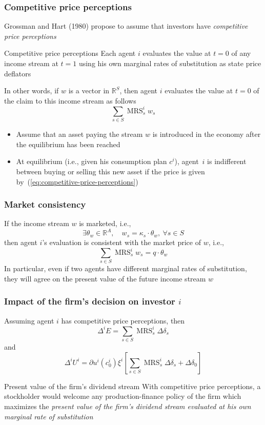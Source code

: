 \documentclass[blue]{beamer}
\def\R{\mathbb{R}}
\DeclareMathOperator\MRS{MRS}
\theoremstyle{definition}
\theoremstyle{example}
\begin{document}

\begin{frame}\frametitle{Competitive price perceptions}

Grossman and Hart (1980) propose to assume that investors have \alert{{\em competitive price perceptions}}

\begin{block}{Competitive price perceptions}
Each agent $i$ evaluates the value at $t=0$ of any income stream at $t=1$ using his own marginal rates of substitution as state price deflators
\end{block}
In other words, if $w$ is a vector in $\R^S$, then agent $i$ evaluates the value at $t=0$ of the claim to this income stream as follows
\begin{equation}\label{eq:competitive-price-perceptions}
\sum_{s\in S} \MRS^i_s w_s
\end{equation}
\begin{itemize}
\item Assume that an asset paying the stream $w$ is introduced in the economy after the equilibrium has been reached
\item At equilibrium (i.e., given his consumption plan $c^i$), agent~$i$ is indifferent between buying or selling this new asset if the price is given by~(\ref{eq:competitive-price-perceptions})
\end{itemize}

\end{frame}


\begin{frame}\frametitle{Market consistency}

If the income stream $w$ is marketed, i.e.,
\[
\exists \theta_w \in \R^A, \quad w_s = \kappa_s \cdot \theta_w, \ \forall s\in S
\]
then agent $i$'s evaluation is consistent with the market price of $w$, i.e.,
\[
\sum_{s\in S} \MRS^i_s w_s =  q \cdot \theta_w
\]
In particular, even if two agents have different marginal rates of substitution, they will agree on the present value of the future income stream $w$


\end{frame}


\begin{frame}\frametitle{Impact of the firm's decision on investor $i$}

Assuming agent $i$ has competitive price perceptions, then
\[
\Delta^i E = \sum_{s\in S} \MRS^i_s \Delta \delta_s
\]
and
\[
\Delta^i U^i = \partial u^i(c^i_0) \xi^i \left[ \sum_{s\in S} \MRS^i_s \Delta \delta_s + \Delta \delta_0\right]
\]
\begin{block}{Present value of the firm's dividend stream}
With competitive price perceptions, a stockholder would welcome any production-finance policy of the firm which maximizes the \alert{\textit{present value of the firm's dividend stream evaluated at his
own marginal rate of substitution} }
\end{block}

\end{frame}
\end{document}
